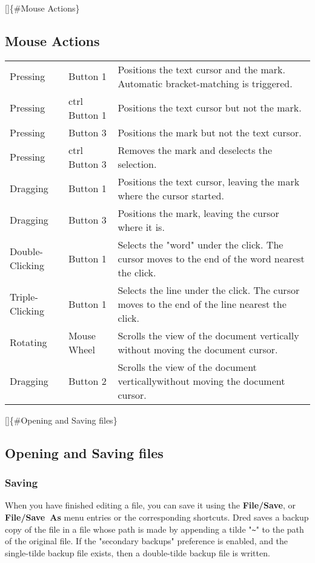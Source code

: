 \documentclass[
]{article}
\begin{document}
{[}{]}\{\#Mouse Actions\}

\hypertarget{mouse-actions}{%
\subsection{Mouse Actions}\label{mouse-actions}}

\begin{longtable}[]{@{}lll@{}}
\toprule
\endhead
Pressing & Button 1 & Positions the text cursor and the mark. Automatic
bracket-matching is triggered.\tabularnewline
Pressing & ctrl Button 1 & Positions the text cursor but not the
mark.\tabularnewline
Pressing & Button 3 & Positions the mark but not the text
cursor.\tabularnewline
Pressing & ctrl Button 3 & Removes the mark and deselects the
selection.\tabularnewline
Dragging & Button 1 & Positions the text cursor, leaving the mark where
the cursor started.\tabularnewline
Dragging & Button 3 & Positions the mark, leaving the cursor where it
is.\tabularnewline
Double-Clicking & Button 1 & Selects the "word" under the click. The
cursor moves to the end of the word nearest the click.\tabularnewline
Triple-Clicking & Button 1 & Selects the line under the click. The
cursor moves to the end of the line nearest the click.\tabularnewline
Rotating & Mouse Wheel & Scrolls the view of the document vertically
without moving the document cursor.\tabularnewline
Dragging & Button 2 & Scrolls the view of the document verticallywithout
moving the document cursor.\tabularnewline
\bottomrule
\end{longtable}

{[}{]}\{\#Opening and Saving files\}

\hypertarget{opening-and-saving-files}{%
\subsection{Opening and Saving files}\label{opening-and-saving-files}}

\hypertarget{saving}{%
\subsubsection{Saving}\label{saving}}

When you have finished editing a file, you can save it using the
\textbf{File/Save}, or \textbf{File/Save~As} menu entries or the
corresponding shortcuts. Dred saves a backup copy of the file in a file
whose path is made by appending a tilde "\texttt{\textasciitilde{}}" to
the path of the original file. If the "secondary backups" preference is
enabled, and the single-tilde backup file exists, then a double-tilde
backup file is written.
\end{document}
